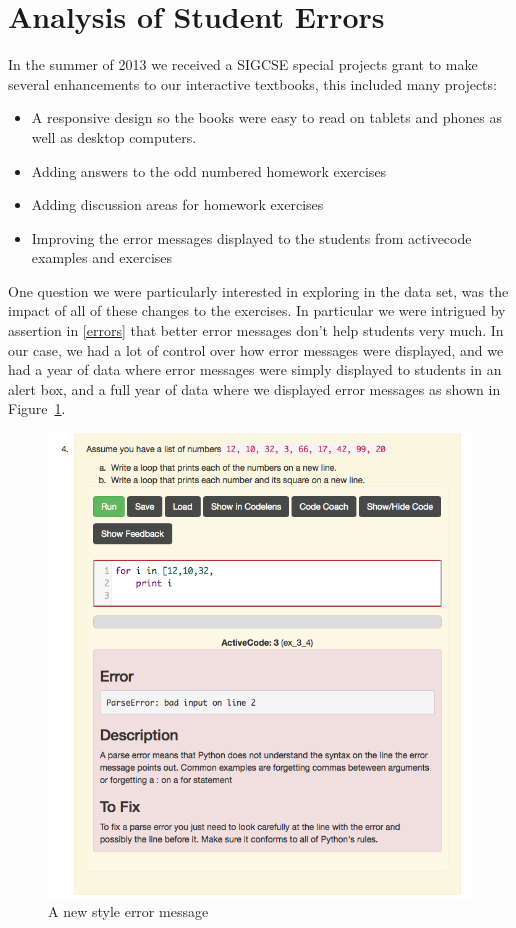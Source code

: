 
\section*{Analysis of Student Errors}

In the summer of 2013 we received a SIGCSE special projects grant to make several enhancements to our interactive textbooks, this included many projects:

\begin{itemize}
	\item A responsive design so the books were easy to read on tablets and phones as well as desktop computers.
	\item Adding answers to the odd numbered homework exercises
	\item Adding discussion areas for homework exercises
	\item Improving the error messages displayed to the students from activecode examples and exercises
\end{itemize}

One question we were particularly interested in exploring in the data set, was the impact of all of these changes to the exercises.  In particular we were intrigued by assertion in \ref{errors} that better error messages don't help students very much.  In our case, we had a lot of control over how error messages were displayed, and we had a year of data where error messages were simply displayed to students in an alert box, and a full year of data where we displayed error messages as shown in Figure~\ref{fig:newmess}.

\begin{figure}[htbp]
	\centering
		\includegraphics[scale=0.5]{emessage.png}
	\caption{A new style error message}
	\label{fig:newmess}
\end{figure}

